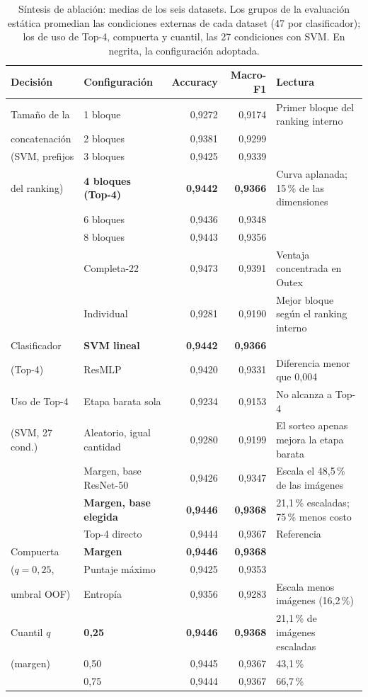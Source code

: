 \documentclass[a4paper,fleqn]{cas-sc}
\begin{document}
\begin{table}[pos=htbp]
\centering
\caption{Síntesis de ablación: medias de los seis datasets. Los grupos de la evaluación estática promedian las condiciones externas de cada dataset (47 por clasificador); los de uso de Top-4, compuerta y cuantil, las 27 condiciones con SVM. En negrita, la configuración adoptada.}
\label{tab:ablacion}
\footnotesize
\begin{tabular}{@{}llrrp{5.2cm}@{}}
\toprule
Decisión & Configuración & Accuracy & Macro-F1 & Lectura \\
\midrule
Tamaño de la & 1 bloque & 0,9272 & 0,9174 & Primer bloque del ranking interno \\
concatenación & 2 bloques & 0,9381 & 0,9299 & \\
(SVM, prefijos & 3 bloques & 0,9425 & 0,9339 & \\
del ranking) & \textbf{4 bloques (Top-4)} & \textbf{0,9442} & \textbf{0,9366} & Curva aplanada; 15\,\% de las dimensiones \\
 & 6 bloques & 0,9436 & 0,9348 & \\
 & 8 bloques & 0,9443 & 0,9356 & \\
 & Completa-22 & 0,9473 & 0,9391 & Ventaja concentrada en Outex \\
 & Individual & 0,9281 & 0,9190 & Mejor bloque según el ranking interno \\
\addlinespace
Clasificador & \textbf{SVM lineal} & \textbf{0,9442} & \textbf{0,9366} & \\
(Top-4) & ResMLP & 0,9420 & 0,9331 & Diferencia menor que 0,004 \\
\addlinespace
Uso de Top-4 & Etapa barata sola & 0,9234 & 0,9153 & No alcanza a Top-4 \\
(SVM, 27 cond.) & Aleatorio, igual cantidad & 0,9280 & 0,9199 & El sorteo apenas mejora la etapa barata \\
 & Margen, base ResNet-50 & 0,9426 & 0,9347 & Escala el 48,5\,\% de las imágenes \\
 & \textbf{Margen, base elegida} & \textbf{0,9446} & \textbf{0,9368} & 21,1\,\% escaladas; 75\,\% menos costo \\
 & Top-4 directo & 0,9444 & 0,9367 & Referencia \\
\addlinespace
Compuerta & \textbf{Margen} & \textbf{0,9446} & \textbf{0,9368} & \\
($q=0{,}25$, & Puntaje máximo & 0,9425 & 0,9353 & \\
umbral OOF) & Entropía & 0,9356 & 0,9283 & Escala menos imágenes (16,2\,\%) \\
\addlinespace
Cuantil $q$ & \textbf{0,25} & \textbf{0,9446} & \textbf{0,9368} & 21,1\,\% de imágenes escaladas \\
(margen) & 0,50 & 0,9445 & 0,9367 & 43,1\,\% \\
 & 0,75 & 0,9444 & 0,9367 & 66,7\,\% \\
\bottomrule
\end{tabular}
\end{table}
\FloatBarrier
\end{document}

